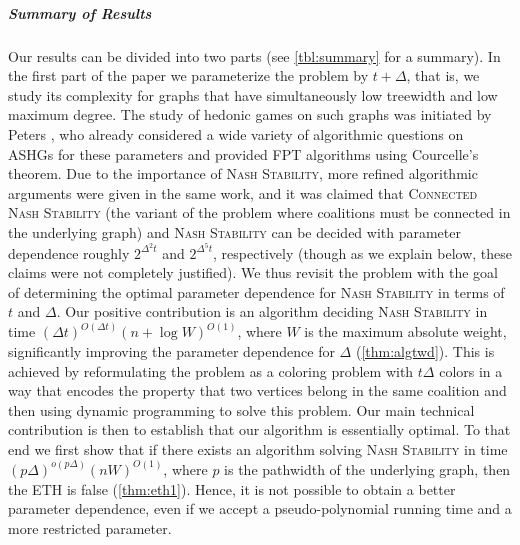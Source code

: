 \documentclass[letterpaper,USenglish,cleveref, autoref, thm-restate]{lipics-v2021}
\begin{document}
\subparagraph*{Summary of Results} Our results can be divided into two parts
(see \cref{tbl:summary} for a summary).  In the first part of the paper we
parameterize the problem by $t+\Delta$, that is, we study its complexity for
graphs that have simultaneously low treewidth and low maximum degree. The study
of hedonic games on such graphs was initiated by Peters \cite{Peters16a}, who
already considered a wide variety of algorithmic questions on ASHGs for these
parameters and provided FPT algorithms using Courcelle's theorem. Due to the
importance of \textsc{Nash Stability}, more refined algorithmic arguments were
given in the same work, and it was claimed that \textsc{Connected Nash
Stability} (the variant of the problem where coalitions must be connected in
the underlying graph) and \textsc{Nash Stability} can be decided with parameter
dependence roughly $2^{\Delta^2t}$ and $2^{\Delta^5t}$, respectively (though as
we explain below, these claims were not completely justified). We thus revisit
the problem with the goal of determining the optimal parameter dependence for
\textsc{Nash Stability} in terms of $t$ and $\Delta$.  Our positive
contribution is an algorithm deciding \textsc{Nash Stability} in time
$\left(\Delta t\right)^{O(\Delta t)} (n+\log W)^{O(1)}$, where $W$ is the
maximum absolute weight, significantly improving the parameter dependence for
$\Delta$ (\cref{thm:algtwd}).  This is achieved by reformulating the problem as
a coloring problem with $t\Delta$ colors in a way that encodes the property
that two vertices belong in the same coalition and then using dynamic
programming to solve this problem.  Our main technical contribution is then to
establish that our algorithm is essentially optimal. To that end we first show
that if there exists an algorithm solving \textsc{Nash Stability} in time
$(p\Delta)^{o(p\Delta)}(nW)^{O(1)}$, where $p$ is the pathwidth of the
underlying graph, then the ETH is false (\cref{thm:eth1}).  Hence, it is not
possible to obtain a better parameter dependence, even if we accept a
pseudo-polynomial running time and a more restricted parameter.
\end{document}
